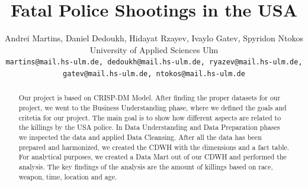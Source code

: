 \documentclass[11pt, journal]{IEEEtran}
\begin{document}
%
\title{Fatal Police Shootings in the USA}
%
%
%

\author{ \parbox{3 in}{\centering Andrei Martins, Daniel Dedoukh, Hidayat Rzayev, Ivaylo Gatev, Spyridon Ntokos\\
				 University of Applied Sciences Ulm\\
         {\tt\small {martins}@mail.hs-ulm.de, {dedoukh}@mail.hs-ulm.de, {ryazev}@mail.hs-ulm.de, {gatev}@mail.hs-ulm.de, {ntokos}@mail.hs-ulm.de}}
}









\maketitle

\begin{abstract}
Our project is based on CRISP-DM Model. After finding the proper datasets for our project, we went to the Business Understanding phase, where we defined the goals and critetia for our project. The main goal is to show how different aspects are related to the killings by the USA police. In Data Understanding and Data Preparation phases we inspected the data and applied Data Cleansing. After all the data has been prepared and harmonized, we created the CDWH with the dimensions and a fact table. For analytical purposes, we created a Data Mart out of our CDWH and performed the analysis. The key findings of the analysis are the amount of killings based on race, weapon, time, location and age.
\end{abstract}
\end{document}
